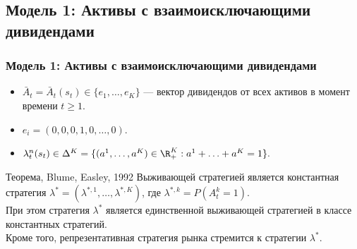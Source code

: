 \documentclass[aspectratio=169]{beamer}
\theoremstyle{definition}
\theoremstyle{remark}
\begin{document}
\subsection{Модель 1: Активы с взаимоисключающими дивидендами}
\begin{frame}\frametitle{Модель 1: Активы с взаимоисключающими дивидендами}
    \begin{itemize}
    
    \item $\bar A_{t} = \bar A_{t}(  s_t ) \in \{e_1, \dots, e_K\}$ — вектор дивидендов от всех активов в момент времени $t\ge 1$.
    \item $e_i = \left( 0,0,0,1,0,\dots, 0 \right)$.
    \item $\lambda_t^n (s_t) \in \Delta^K
    =\{ (a^1, \dots, a^K) \in \R^K_+ : a^1+\ldots+a^K = 1\}.$
    \end{itemize}

    \begin{block}{Теорема, Blume, Easley, 1992}
    Выживающей стратегией является константная стратегия $\lambda^*=(\lambda^{*,1}, \dots, \lambda^{*,K} )$, где $\lambda^{*,k}=P(A_t^k=1)$.\\
    При этом стратегия $\lambda^*$ является единственной выживающей стратегией в классе константных стратегий.\\
    Кроме того, репрезентативная стратегия рынка стремится к стратегии $\lambda^*$.
    \end{block}
\end{frame}

\end{document}
